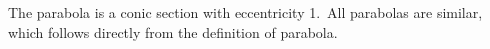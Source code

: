 \documentclass[12pt]{article}
\begin{document}

The parabola is a conic section with eccentricity 1.\, All parabolas are similar, which follows directly from the definition of parabola.




\end{document}
